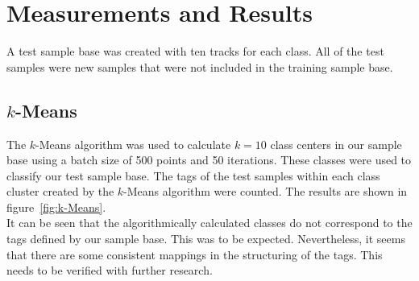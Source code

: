 \section{Measurements and Results}
\label{sec:Measurements}
A test sample base was created with ten tracks for each class. All of the test samples were new samples that were not included in the training sample base.

\subsection{$k$-Means}
The $k$-Means algorithm was used to calculate $k=10$ class centers in our sample base using a batch size of 500 points and 50 iterations. These classes were used to classify our test sample base. The tags of the test samples within each class cluster created by the $k$-Means algorithm were counted. The results are shown in figure~\ref{fig:k-Means}.\\
It can be seen that the algorithmically calculated classes do not correspond to the tags defined by our sample base. This was to be expected. Nevertheless, it seems that there are some consistent mappings in the structuring of the tags. This needs to be verified with further research.

